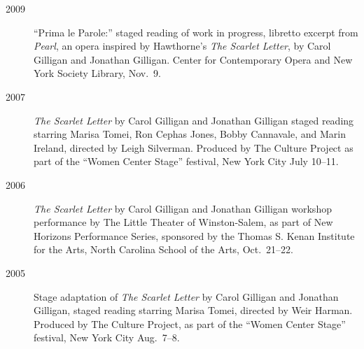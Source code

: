 \begin{description}
\item[2009] ``Prima le Parole:'' staged reading of work in progress, libretto excerpt from \emph{Pearl}, an opera inspired by Hawthorne's \emph{The Scarlet Letter}, by Carol Gilligan and Jonathan Gilligan. Center for Contemporary Opera and New York Society Library, Nov.~9. 
\item[2007] \emph{The Scarlet Letter\/} by Carol Gilligan and Jonathan Gilligan staged reading starring Marisa Tomei, Ron Cephas Jones, Bobby Cannavale, and Marin Ireland, directed by Leigh Silverman. Produced by The Culture Project as part of the ``Women Center Stage'' festival, New York City July 10--11.
\item[2006] \emph{The Scarlet Letter\/} by Carol Gilligan and Jonathan Gilligan workshop performance by The Little Theater of Winston-Salem, as part of New Horizons Performance Series, sponsored by the Thomas S. Kenan Institute for the Arts, North Carolina School of the Arts, Oct.~21--22.
\item[2005] Stage adaptation of \emph{The Scarlet Letter\/} by Carol Gilligan and Jonathan Gilligan, staged reading starring Marisa Tomei, directed by Weir Harman. Produced by The Culture Project, as part of the ``Women Center Stage'' festival, New York City Aug.\ 7--8.
\end{description}